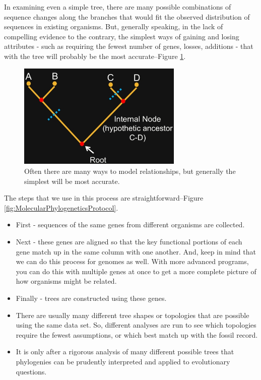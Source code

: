 \documentclass[]{article}
\begin{document}
In examining even a simple tree,
there are many possible combinations
of sequence changes along the branches
that would fit the observed distribution
of sequences in existing organisms.
But, generally speaking,
in the lack of compelling evidence
to the contrary,
the simplest ways of gaining
and losing attributes -
such as requiring the fewest number
of genes, losses, additions -
that with the tree
will probably be the most accurate--Figure \ref{fig:PhylogenicTree}.

\begin{figure}[H]
	\begin{center}
		\caption[Generally the simplest tree will be most accurate]{Often there are many ways to model relationships, but generally the simplest will be most accurate.}\label{fig:PhylogenicTree}
	\includegraphics[width=0.7\textwidth]{PhylogenicTree}
	\end{center}
\end{figure}


The steps that we use in this process
are straightforward--Figure \ref{fig:MolecularPhylogeneticsProtocol}.
\begin{itemize}
	\item First - sequences of the same genes
	from different organisms are collected.
	\item Next - these genes are aligned
	so that the key functional portions
	of each gene
	match up in the same column
	with one another.
	And, keep in mind that we can do
	this process for genomes as well.
	With more advanced programs,
	you can do this with
	multiple genes at once
	to get a more complete picture
	of how organisms might be related.
	\item Finally - trees are constructed using these genes.
	\item There are usually
	many different tree shapes
	or topologies that are possible
	using the same data set.
	So, different analyses are run to see
	which topologies require
	the fewest assumptions,
	or which best match up
	with the fossil record.
	
	\item It is only after a rigorous analysis
	of many different possible trees
	that phylogenies can be
	prudently interpreted
	and applied to evolutionary questions.
	
\end{itemize}
\end{document}
